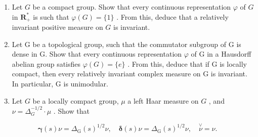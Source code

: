 \exercisesection{}

\begin{enumerate}
\def\labelenumi{\arabic{enumi})}
\item
  Let \(G\) be a compact group. Show that every continuous representation \(\varphi\) of \(G\) in \(\mathbf{R}_+^*\) is such that \(\varphi(G) = \{1\}\) . From this, deduce that a relatively invariant positive measure on \(G\) is invariant.
\item
  Let G be a topological group, such that the commutator subgroup of G is dense in G. Show that every continuous representation \(\varphi\) of G in a Hausdorff abelian group satisfies \(\varphi(G) = \{e\}\) . From this, deduce that if G is locally compact, then every relatively invariant complex measure on G is invariant. In particular, G is unimodular.
\item
  Let \(G\) be a locally compact group, \(\mu\) a left Haar measure on \(G\) , and \(\nu = \Delta_G^{-1/2} \cdot \mu\) . Show that
\end{enumerate}

\[
\boldsymbol {\gamma} (s) \nu = \Delta_ {\mathrm{G}} (s) ^ {1 / 2} \nu , \quad \boldsymbol {\delta} (s) \nu = \Delta_ {\mathrm{G}} (s) ^ {1 / 2} \nu , \quad \stackrel {\vee} {\nu} = \nu .
\]

